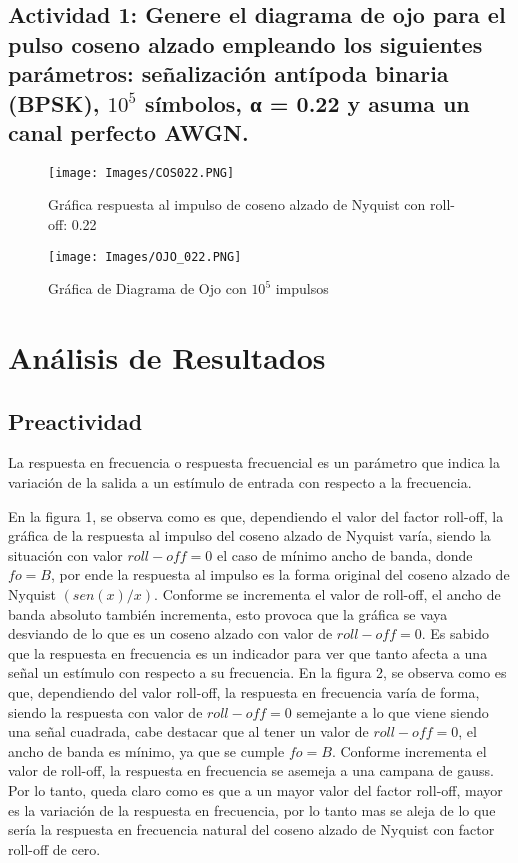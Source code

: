 \documentclass[lettersize,journal]{IEEEtran}
\begin{document}
\subsection{Actividad 1: Genere el diagrama de ojo para el pulso coseno alzado empleando los siguientes parámetros: señalización antípoda binaria (BPSK), $10^5$ símbolos, α = 0.22 y
asuma un canal perfecto AWGN.}
\begin{figure}[h!]
    \centering
    \texttt{[image: Images/COS022.PNG]}
    \caption{Gráfica respuesta al impulso de coseno alzado de Nyquist con roll-off: 0.22}
    \label{fig:my_label}
\end{figure}

\begin{figure}[h!]
    \centering
    \texttt{[image: Images/OJO\_022.PNG]}
    \caption{Gráfica de Diagrama de Ojo con $10^5$ impulsos}
    \label{fig:my_label}
\end{figure}
\newpage

\section{Análisis de Resultados}\label{sec:analisis_resultados}

\subsection{Preactividad}
\newline
La respuesta en frecuencia o respuesta frecuencial es un parámetro que indica la variación de la salida a un estímulo de entrada con respecto a la frecuencia.

En la figura 1, se observa como es que, dependiendo el valor del factor roll-off, la gráfica de la respuesta al impulso del coseno alzado de Nyquist varía, siendo la situación con valor $roll-off = 0$ el caso de mínimo ancho de banda, donde $fo = B$, por ende la respuesta al impulso es la forma original del coseno alzado de Nyquist $(sen(x)/x)$.
Conforme se incrementa el valor de roll-off, el ancho de banda absoluto también incrementa, esto provoca que la gráfica se vaya desviando de lo que es un coseno alzado con valor de $roll-off = 0$.
\newline
Es sabido que la respuesta en frecuencia es un indicador para ver que tanto afecta a una señal un estímulo con respecto a su frecuencia. En la figura 2, se observa como es que, dependiendo del valor roll-off, la respuesta en frecuencia varía de forma, siendo la respuesta con valor de $roll-off = 0$ semejante a lo que viene siendo una señal cuadrada, cabe destacar que al tener un valor de $roll-off = 0$, el ancho de banda es mínimo, ya que se cumple $fo = B$. Conforme incrementa el valor de roll-off, la respuesta en frecuencia se asemeja a una campana de gauss. Por lo tanto, queda claro como es que a un mayor valor del factor roll-off, mayor es la variación de la respuesta en frecuencia, por lo tanto mas se aleja de lo que sería la respuesta en frecuencia natural del coseno alzado de Nyquist con factor roll-off de cero. 
\newline
\end{document}
